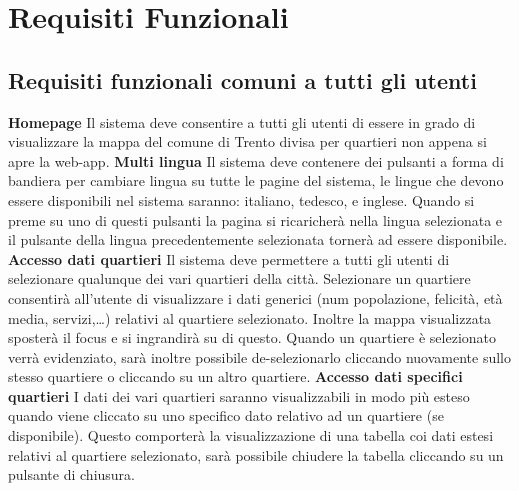 \chapter{Requisiti Funzionali} 
\thispagestyle{stdPage}
    \section{Requisiti funzionali comuni a tutti gli utenti}
        \begin{rfList}
            \rfItem \textbf{Homepage} Il sistema deve consentire a tutti gli utenti di essere in grado di visualizzare la mappa del comune di Trento divisa per quartieri non appena si apre la web-app.
            \rfItem \textbf{Multi lingua} Il sistema deve contenere dei pulsanti a forma di bandiera per cambiare lingua su tutte le pagine del sistema, le lingue che devono essere disponibili nel sistema saranno: italiano, tedesco, e inglese. Quando si preme su uno di questi pulsanti la pagina si ricaricherà nella lingua selezionata e il pulsante della lingua precedentemente selezionata tornerà ad essere disponibile.
            \rfItem \textbf{Accesso dati quartieri} Il sistema deve permettere a tutti gli utenti di selezionare qualunque dei vari quartieri della città. Selezionare un quartiere consentirà all'utente di visualizzare i dati generici (num popolazione, felicità, età media, servizi,\dots) relativi al quartiere selezionato. Inoltre la mappa visualizzata sposterà il focus e si ingrandirà su di questo. Quando un quartiere è selezionato verrà evidenziato, sarà inoltre possibile de-selezionarlo cliccando nuovamente sullo stesso quartiere o cliccando su un altro quartiere.
            \rfItem \textbf{Accesso dati specifici quartieri} I dati dei vari quartieri saranno visualizzabili in modo più esteso quando viene cliccato su uno specifico dato relativo ad un quartiere (se disponibile). Questo comporterà la visualizzazione di una tabella coi dati estesi relativi al quartiere selezionato, sarà possibile chiudere la tabella cliccando su un pulsante di chiusura. 
        \end{rfList} 
